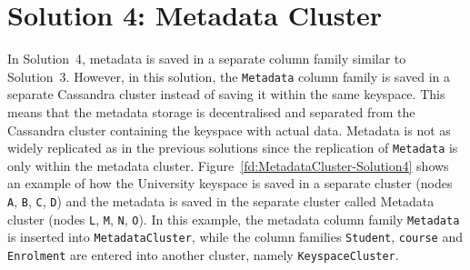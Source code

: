 \section{Solution 4:  Metadata Cluster} \label{s:design-sol4}

In Solution~4,  metadata  is saved in a separate column family
similar to Solution~3. 
However,  in this solution,  the \texttt{Metadata} column family is saved in a
separate Cassandra cluster instead of saving it
within the same keyspace.  This means that the metadata storage
is decentralised and separated from the Cassandra cluster containing the
keyspace with actual data. 
Metadata  is not as widely replicated as in the previous solutions since the
replication of \texttt{Metadata} is only within the metadata cluster. 
Figure~\ref{fd:MetadataCluster-Solution4} shows an example of how the University
keyspace is saved in a separate cluster (nodes \texttt{A}, \texttt{B}, 
\texttt{C},  \texttt{D}) and the metadata is saved in the separate cluster called
Metadata cluster (nodes \texttt{L}, \texttt{M}, 
\texttt{N},  \texttt{O}).  
In this example,  the metadata column family \texttt{Metadata} is
inserted into \texttt{MetadataCluster},  while the column
families \texttt{Student},  \texttt{course} and \texttt{Enrolment} are entered
into another cluster,  namely \texttt{KeyspaceCluster}. 


